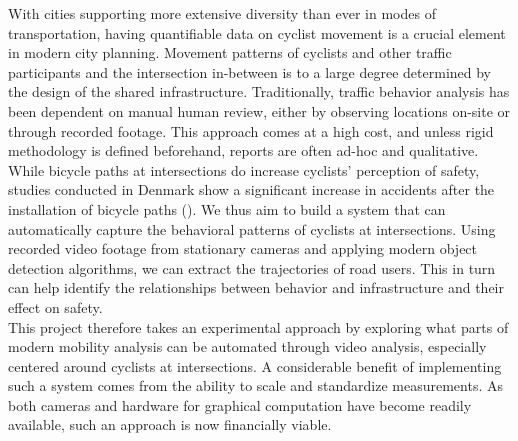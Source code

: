 With cities supporting more extensive diversity than ever in modes of transportation,
having quantifiable data on cyclist movement is a crucial element in modern city planning. 
Movement patterns of cyclists and other traffic participants and the intersection in-between 
is to a large degree determined by the design of the shared infrastructure. 
Traditionally, traffic behavior analysis has been dependent on manual human review, either by observing locations on-site or through recorded footage. 
This approach comes at a high cost, and unless rigid methodology is defined beforehand, reports are often ad-hoc and qualitative. 
\ \\

While bicycle paths at intersections do increase cyclists' perception of safety, 
studies conducted in Denmark show a significant increase in accidents after the installation of bicycle paths (\cite{intersection_safety}).
We thus aim to build a system that can automatically capture the behavioral patterns of cyclists at intersections.
Using recorded video footage from stationary cameras and applying modern object detection algorithms, 
we can extract the trajectories of road users. 
This in turn can help identify the relationships between behavior and infrastructure and their effect on safety. 
\ \\

This project therefore takes an experimental approach by exploring what parts of modern mobility analysis can be automated
through video analysis, especially centered around cyclists at intersections.
A considerable benefit of implementing such a system comes from the ability to scale and standardize measurements.
As both cameras and hardware for graphical computation have become readily available, such an approach is now financially viable.
